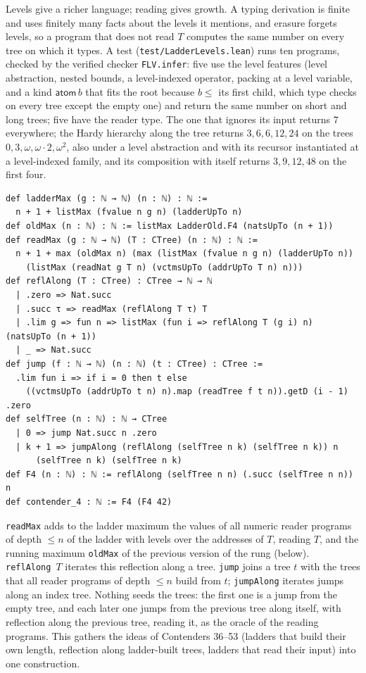 \documentclass[11pt]{article}
\theoremstyle{definition}
\theoremstyle{remark}
\newcommand{\lean}[1]{\texttt{#1}}
\begin{document}
Levels give a richer language; reading gives growth. A typing derivation is
finite and uses finitely many facts about the levels it mentions, and erasure
forgets levels, so a program that does not read $T$ computes the same number
on every tree on which it types. A test (\lean{test/LadderLevels.lean}) runs
ten programs, checked by the verified checker \lean{FLV.infer}: five use the
level features (level abstraction, nested bounds, a level-indexed operator,
packing at a level variable, and a kind $\mathsf{atom}\,b$ that fits the root
because $b\le$ its first child, which type checks on every tree except the
empty one) and return the same number on short and long trees; five have the
reader type. The one that ignores its input returns $7$ everywhere; the Hardy
hierarchy along the tree returns $3,6,6,12,24$ on the trees
$0,3,\omega,\omega\cdot2,\omega^2$, also under a level abstraction and with
its recursor instantiated at a level-indexed family, and its composition with
itself returns $3,9,12,48$ on the first four.
\begin{lstlisting}
def ladderMax (g : ℕ → ℕ) (n : ℕ) : ℕ :=
  n + 1 + listMax (fvalue n g n) (ladderUpTo n)
def oldMax (n : ℕ) : ℕ := listMax LadderOld.F4 (natsUpTo (n + 1))
def readMax (g : ℕ → ℕ) (T : CTree) (n : ℕ) : ℕ :=
  n + 1 + max (oldMax n) (max (listMax (fvalue n g n) (ladderUpTo n))
    (listMax (readNat g T n) (vctmsUpTo (addrUpTo T n) n)))
def reflAlong (T : CTree) : CTree → ℕ → ℕ
  | .zero => Nat.succ
  | .succ τ => readMax (reflAlong T τ) T
  | .lim g => fun n => listMax (fun i => reflAlong T (g i) n) (natsUpTo (n + 1))
  | _ => Nat.succ
def jump (f : ℕ → ℕ) (n : ℕ) (t : CTree) : CTree :=
  .lim fun i => if i = 0 then t else
    ((vctmsUpTo (addrUpTo t n) n).map (readTree f t n)).getD (i - 1) .zero
def selfTree (n : ℕ) : ℕ → CTree
  | 0 => jump Nat.succ n .zero
  | k + 1 => jumpAlong (reflAlong (selfTree n k) (selfTree n k)) n
      (selfTree n k) (selfTree n k)
def F4 (n : ℕ) : ℕ := reflAlong (selfTree n n) (.succ (selfTree n n)) n
def contender_4 : ℕ := F4 (F4 42)
\end{lstlisting}
\lean{readMax} adds to the ladder maximum the values of all numeric reader
programs of depth $\le n$ of the ladder with levels over the addresses of $T$,
reading $T$, and the running maximum \lean{oldMax} of the previous version of
the rung (below).
\lean{reflAlong}~$T$ iterates this reflection along a tree. \lean{jump} joins
a tree $t$ with the trees that all reader programs of depth $\le n$ build from
$t$; \lean{jumpAlong} iterates jumps along an index tree. Nothing seeds the
trees: the first one is a jump from the empty tree, and each later one jumps
from the previous tree along itself, with reflection along the previous tree,
reading it, as the oracle of the reading programs. This gathers the ideas of
Contenders 36--53 (ladders that build their own length, reflection along
ladder-built trees, ladders that read their input) into one construction.
\end{document}
